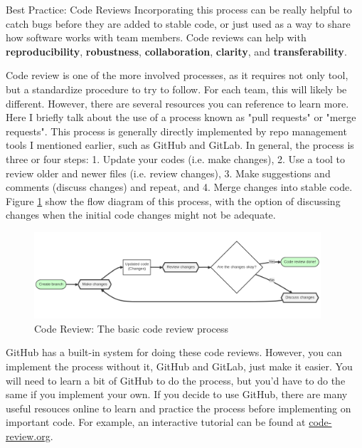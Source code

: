 \documentclass[final]{beamer}
\newlength{\colwidth}
\begin{document}
\begin{frame}[t]
\begin{columns}[t]
\begin{column}{\colwidth}
\begin{block}{Best Practice: Code Reviews}
    Incorporating this process can be really helpful to catch bugs before they
    are added to stable code, or just used as a way to share how software works
    with team members.
    Code reviews can help with \textbf{reproducibility},
    \textbf{robustness},  \textbf{collaboration}, \textbf{clarity}, and 
    \textbf{transferability}.
  
    Code review is one of the more involved processes, as it requires not only
    tool, but a standardize procedure to try to follow.
    For each team, this will likely be different.
    However, there are several resources you can reference to learn more.
    Here I briefly talk about the use of a process known as "pull requests" or
    "merge requests".
    This process is generally directly implemented by repo management tools I
    mentioned earlier, such as GitHub and GitLab.
    In general, the process is three or four steps:
    1. Update your codes (i.e. make changes), 2. Use a tool to review older
    and newer files (i.e. review changes), 3. Make suggestions and comments
    (discuss changes) and repeat, and 4. Merge changes into stable code.
    Figure \ref*{fig:code-review} show the flow diagram of this process, with
    the option of discussing changes when the initial code changes might not be
    adequate.

    \begin{figure}
      \centering
      \includegraphics[width=0.95\textwidth]{tess2024/code-review-flow-diagram.png}
      \caption{Code Review: The basic code review process}
      \label{fig:code-review}
    \end{figure}
    
    GitHub has a built-in system for doing these code reviews.
    However, you can implement the process without it, GitHub and GitLab, just
    make it easier.
    You will need to learn a bit of GitHub to do the process, but you'd have to
    do the same if you implement your own.
    If you decide to use GitHub, there are many useful resouces online to learn
    and practice the process before implementing on important code.
    For example, an interactive tutorial can be found at
    \href{https://code-review.org}{code-review.org}.


\end{block}
\end{column}
\end{columns}
\end{frame}
\end{document}
